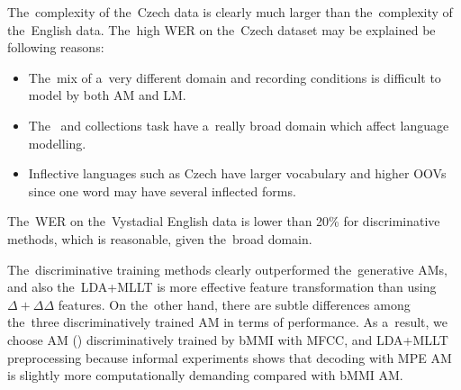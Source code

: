 

The~complexity of the~Czech data is clearly much larger than the~complexity of the~English data.
The~high \ac{WER} on the~Czech dataset may be explained be following reasons:
\begin{itemize}
    \item The~mix of a~very different domain and recording conditions is difficult to model by both \ac{AM} and \ac{LM}. 
    \item The~ and  collections task have a~really broad domain which affect language modelling.
    \item Inflective languages such as Czech have larger vocabulary and higher \acp{OOV} since one word may have several inflected forms.
\end{itemize}

The~\ac{WER} on the~Vystadial English data is lower than 20\% for discriminative methods, which is reasonable, given the~broad domain.

The~discriminative training methods clearly outperformed the~generative \acp{AM}, and also the~\ac{LDA}+\ac{MLLT} is more effective feature transformation than using $\Delta+\Delta\Delta$ features.
On the~other hand, there are subtle differences among the~three discriminatively trained \ac{AM} in terms of performance.
As a~result, we choose \ac{AM} () discriminatively trained by \ac{bMMI} with \ac{MFCC}, and \ac{LDA}+\ac{MLLT} preprocessing because informal experiments shows that decoding with \ac{MPE} \acl{AM} is slightly more computationally demanding compared with \ac{bMMI} \ac{AM}. 


